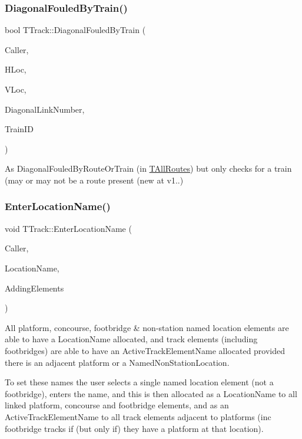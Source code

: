 \subsubsection{\texorpdfstring{Diagonal\+Fouled\+By\+Train()}{DiagonalFouledByTrain()}}
{\footnotesize\ttfamily bool T\+Track\+::\+Diagonal\+Fouled\+By\+Train (\begin{DoxyParamCaption}\item[{int}]{Caller,  }\item[{int}]{H\+Loc,  }\item[{int}]{V\+Loc,  }\item[{int}]{Diagonal\+Link\+Number,  }\item[{int \&}]{Train\+ID }\end{DoxyParamCaption})}

As Diagonal\+Fouled\+By\+Route\+Or\+Train (in \mbox{\hyperlink{class_t_all_routes}{T\+All\+Routes}}) but only checks for a train (may or may not be a route present (new at v1..) \mbox{\label{class_t_track_a433736aed04f76b3d0c39f0696c3bb18}} 
\subsubsection{\texorpdfstring{Enter\+Location\+Name()}{EnterLocationName()}}
{\footnotesize\ttfamily void T\+Track\+::\+Enter\+Location\+Name (\begin{DoxyParamCaption}\item[{int}]{Caller,  }\item[{Ansi\+String}]{Location\+Name,  }\item[{bool}]{Adding\+Elements }\end{DoxyParamCaption})}

All platform, concourse, footbridge \& non-\/station named location elements are able to have a Location\+Name allocated, and track elements (including footbridges) are able to have an Active\+Track\+Element\+Name allocated provided there is an adjacent platform or a Named\+Non\+Station\+Location.

To set these names the user selects a single named location element (not a footbridge), enters the name, and this is then allocated as a Location\+Name to all linked platform, concourse and footbridge elements, and as an Active\+Track\+Element\+Name to all track elements adjacent to platforms (inc footbridge tracks if (but only if) they have a platform at that location). \mbox{\label{class_t_track_a13a1cc9770c8729d04ad4c0130f91634}} 
